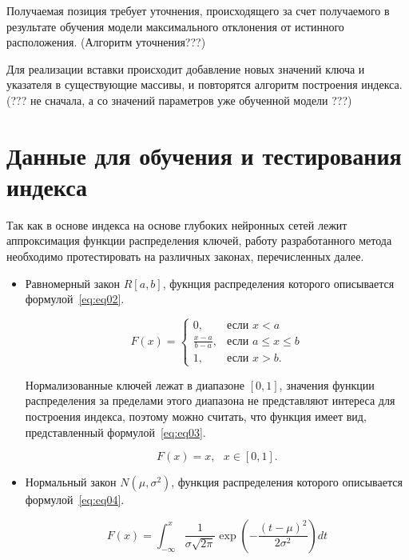 
Получаемая позиция требует уточнения, происходящего за счет получаемого в
результате обучения модели максимального отклонения от истинного расположения.
(Алгоритм уточнения???)

Для реализации вставки происходит добавление новых значений ключа и указателя в
существующие массивы, и повторятся алгоритм построения индекса.
(??? не сначала, а со значений параметров уже обученной модели ???)

\section{Данные для обучения и тестирования индекса}

Так как в основе индекса на основе глубоких нейронных сетей лежит аппроксимация
функции распределения ключей, работу разработанного метода необходимо
протестировать на различных законах, перечисленных далее.

\begin{itemize}
    \item Равномерный закон $R[a,b]$, фукнция распределения которого описывается
        формулой~\ref{eq:eq02}.

        \begin{equation}\label{eq:eq02}
            F(x) = \begin{cases}
                0, & \text{если } x < a \\
                \frac{x - a}{b - a}, & \text{если } a \leq x \leq b \\
                1, & \text{если } x > b.
            \end{cases}
        \end{equation}

        Нормализованные ключей лежат в диапазоне $[0, 1]$, значения функции
        распределения за пределами этого диапазона не представляют интереса для
        построения индекса, поэтому можно считать, что функция имеет вид,
        представленный формулой~\ref{eq:eq03}.

        \begin{equation}\label{eq:eq03}
            F(x) = x, \text{  } x \in [0, 1].
        \end{equation}

    \item Нормальный закон $N(\mu, \sigma^2)$, функция распределения которого
        описывается формулой~\ref{eq:eq04}.

        \begin{equation}\label{eq:eq04}
            F(x) = \int_{-\infty}^{x} \frac{1}{{\sigma \sqrt{2\pi}}}
            \exp\left(-\frac{{(t - \mu)^2}}{{2\sigma^2}}\right) dt
        \end{equation}
\end{itemize}


